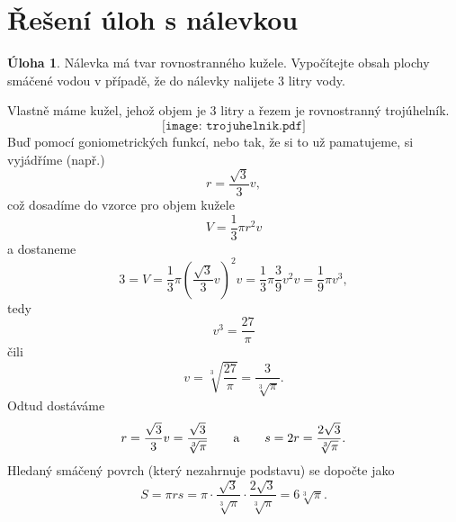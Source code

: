 \documentclass[10pt,a4paper]{article}
\theoremstyle{definition}
\newtheorem*{uloha}{Úloha}
\newenvironment{res}{\proof}{\endproof}
\begin{document}
\renewcommand*{\proofname}{Řešení}

\section*{Řešení úloh s nálevkou}

\begin{uloha}
Nálevka má tvar rovnostranného kužele. Vypočítejte obsah plochy smáčené vodou v případě, že do nálevky nalijete 3 litry vody.
\end{uloha}

\begin{res}
Vlastně máme kužel, jehož objem je 3 litry a řezem je rovnostranný trojúhelník.
\[ \texttt{[image: trojuhelnik.pdf]} \]
Buď pomocí goniometrických funkcí, nebo tak, že si to už pamatujeme, si vyjádříme (např.)
\[ r = \frac{\sqrt3}3 v, \]
což dosadíme do vzorce pro objem kužele
\[ V = \frac13 \pi r^2 v \]
a dostaneme
\[ 3 = V = \frac13 \pi \left(\frac{\sqrt3}3 v\right)^2 v = \frac13 \pi \frac39 v^2 v = \frac19 \pi v^3, \]
tedy
\[ v^3 = \frac{27}{\pi} \]
čili
\[ v = \sqrt[3]{\frac{27}{\pi}} = \frac{3}{\sqrt[3]{\pi}}. \]
Odtud dostáváme
\[ r = \frac{\sqrt3}3 v = \frac{\sqrt3}{\sqrt[3]{\pi}} \qquad \text a \qquad s = 2r = \frac{2\sqrt3}{\sqrt[3]{\pi}}. \]
Hledaný smáčený povrch (který nezahrnuje podstavu) se dopočte jako
\[ S = \pi r s = \pi \cdot \frac{\sqrt3}{\sqrt[3]{\pi}} \cdot \frac{2\sqrt3}{\sqrt[3]{\pi}} = 6 \sqrt[3]{\pi}. \]
\end{res}
\end{document}

